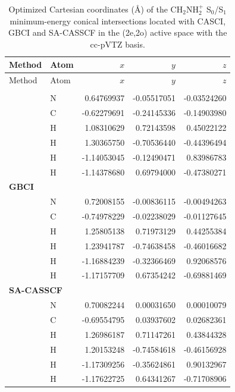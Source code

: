 \begin{longtable}{llrrr}
\caption{Optimized Cartesian coordinates (\AA) of the CH$_2$NH$_2^+$ S$_0$/S$_1$ minimum-energy conical intersections located with CASCI, GBCI and SA-CASSCF in the (2e,2o) active space with the cc-pVTZ basis.}\label{tab:si_ch2nh2_ccpvtz_meci_geometries_2o2e}\\
\hline
Method & Atom & $x$ & $y$ & $z$ \\
\hline
\endfirsthead
\hline
Method & Atom & $x$ & $y$ & $z$ \\
\hline
\endhead
\hline
\endfoot
\multicolumn{5}{l}{\textbf{CASCI}}\\
 & N &  0.64769937 & -0.05517051 & -0.03524260 \\
 & C & -0.62279691 & -0.24145336 & -0.14903980 \\
 & H &  1.08310629 &  0.72143598 &  0.45022122 \\
 & H &  1.30365750 & -0.70536440 & -0.44396494 \\
 & H & -1.14053045 & -0.12490471 &  0.83986783 \\
 & H & -1.14378680 &  0.69794000 & -0.47380271 \\
\multicolumn{5}{l}{\textbf{GBCI}}\\
 & N &  0.72008155 & -0.00836115 & -0.00494263 \\
 & C & -0.74978229 & -0.02238029 & -0.01127645 \\
 & H &  1.25805138 &  0.71973129 &  0.44255384 \\
 & H &  1.23941787 & -0.74638458 & -0.46016682 \\
 & H & -1.16884239 & -0.32366469 &  0.92068576 \\
 & H & -1.17157709 &  0.67354242 & -0.69881469 \\
\multicolumn{5}{l}{\textbf{SA-CASSCF}}\\
 & N &  0.70082244 &  0.00031650 &  0.00010079 \\
 & C & -0.69554795 &  0.03937602 &  0.02682361 \\
 & H &  1.26986187 &  0.71147261 &  0.43844328 \\
 & H &  1.20153248 & -0.74584618 & -0.46156928 \\
 & H & -1.17309256 & -0.35624861 &  0.90132967 \\
 & H & -1.17622725 &  0.64341267 & -0.71708906 \\
\end{longtable}
